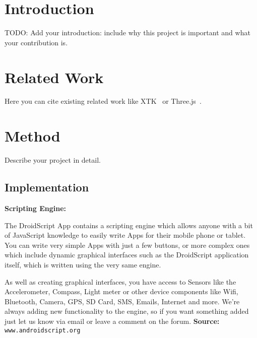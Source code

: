 \documentclass[sigconf]{acmart}
\begin{document}
\maketitle
\newpage
\section{Introduction}

TODO: Add your introduction: include why this project is important and what your contribution is.

\section{Related Work}

Here you can cite existing related work like XTK~\cite{XTK} or Three.js~\cite{Threejs}.

\section{Method}

Describe your project in detail.

\subsection{Implementation}

\vspace{0.09 cm}
\textbf{Scripting Engine:}

The DroidScript App contains a scripting engine which allows anyone with a bit of JavaScript knowledge to easily write Apps for their mobile phone or tablet. You can write very simple Apps with just a few buttons, or more complex ones which include dynamic graphical interfaces such as the DroidScript application itself, which is written using the very same engine.

As well as creating graphical interfaces, you have access to Sensors like the Accelerometer, Compass, Light meter or other device components like Wifi, Bluetooth, Camera, GPS, SD Card, SMS, Emails, Internet and more. We're always adding new functionality to the engine, so if you want something added just let us know via email or leave a comment on the forum.
\vspace{0.045 cm}
\newline\textbf{Source: } \nolinkurl{ www.androidscript.org}\newline
\vspace{0.045 cm}
\end{document}
